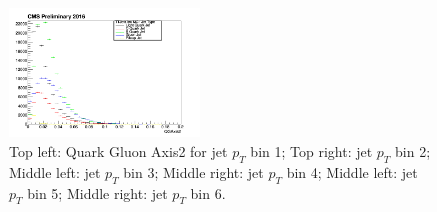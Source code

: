 \begin{figure}[htbp]
\begin{center}
  \includegraphics[width=0.45\textwidth]{sections/mc4/TopTagger/figures/_b_qgaxis2jetptbin5_.png}
 \end{center}
 \caption{Top left: Quark Gluon Axis2 for jet $p_{T}$ bin 1; Top right: jet $p_{T}$ bin 2; Middle left: jet $p_{T}$ bin 3; Middle right: jet $p_{T}$ bin 4; Middle left: jet $p_{T}$ bin 5; Middle right: jet $p_{T}$ bin 6.}
 \label{fig:c4ttqgaxis2jetpt}
\end{figure}

\clearpage
